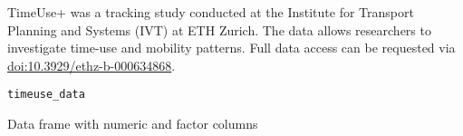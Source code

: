 
%
\begin{Description}
TimeUse+ \citep{Winkler+Meister+Axhausen:2024} was a tracking study
conducted at the Institute for Transport Planning and Systems (IVT) at ETH Zurich.
The data allows researchers to investigate time-use and mobility patterns.
Full data access can be requested via \url{doi:10.3929/ethz-b-000634868}.
\end{Description}
%
\begin{Usage}
\begin{verbatim}
timeuse_data
\end{verbatim}
\end{Usage}
%
\begin{Format}
Data frame with numeric and factor columns
\begin{description}


\end{description}
\end{Format}
